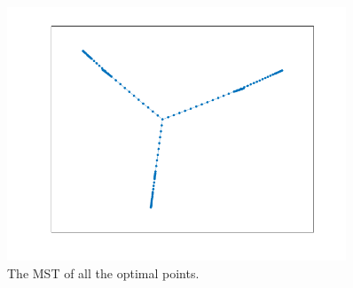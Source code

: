 \documentclass{beamer}
\begin{document}
\begin{frame}
  \begin{figure}
    \includegraphics[width=0.9\textwidth]{./figures/fig19.png}
    \caption{The MST of all the optimal points.}
  \end{figure}
\end{frame}
\end{document}
